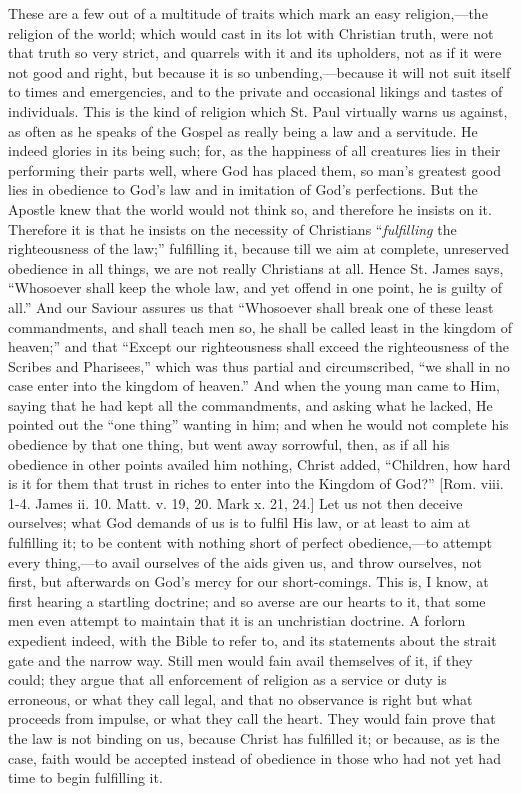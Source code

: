 These are a few out of a multitude of traits which mark an easy
religion,—the religion of the world; which would cast in its lot
with Christian truth, were not that truth so very strict, and quarrels
with it and its upholders, not as if it were not good and right, but
because it is so unbending,—because it will not suit itself to times
and emergencies, and to the private and occasional likings and tastes
of individuals. This is the kind of religion which St. Paul virtually
warns us against, as often as he speaks of the Gospel as really being
a law and a servitude. He indeed glories in its being such; for, as
the happiness of all creatures lies in their performing their parts
well, where God has placed them, so man's greatest good lies in
obedience to God's law and in imitation of God's perfections. But the
Apostle knew that the world would not think so, and therefore he
insists on it. Therefore it is that he insists on the necessity of
Christians ``\emph{fulfilling} the righteousness of the law;''
fulfilling it, because till we aim at complete, unreserved obedience
in all things, we are not really Christians at all. Hence St. James
says, ``Whosoever shall keep the whole law, and yet offend in one
point, he is guilty of all.'' And our Saviour assures us that
``Whosoever shall break one of these least commandments, and shall
teach men so, he shall be called least in the kingdom of heaven;''
and that ``Except our righteousness shall exceed the righteousness
of the Scribes and Pharisees,'' which was thus partial and
circumscribed, ``we shall in no case enter into the kingdom of
heaven.'' And when the young man came to Him, saying that he had
kept all the commandments, and asking what he lacked, He pointed out
the ``one thing'' wanting in him; and when he would not
complete his obedience by that one thing, but went away sorrowful,
then, as if all his obedience in other points availed him nothing,
Christ added, ``Children, how hard is it for them that trust in
riches to enter into the Kingdom of God?'' [Rom. viii. 1-4. James
ii. 10. Matt. v. 19, 20. Mark x. 21, 24.] Let us not then deceive
ourselves; what God demands of us is to fulfil His law, or at least to
aim at fulfilling it; to be content with nothing short of perfect
obedience,—to attempt every thing,—to avail ourselves of the aids
given us, and throw ourselves, not first, but afterwards on God's
mercy for our short-comings. This is, I know, at first hearing a
startling doctrine; and so averse are our hearts to it, that some men
even attempt to maintain that it is an unchristian doctrine. A forlorn
expedient indeed, with the Bible to refer to, and its statements about
the strait gate and the narrow way. Still men would fain avail
themselves of it, if they could; they argue that all enforcement of
religion as a service or duty is erroneous, or what they call legal,
and that no observance is right but what proceeds from impulse, or
what they call the heart. They would fain prove that the law is not
binding on us, because Christ has fulfilled it; or because, as is the
case, faith would be accepted instead of obedience in those who had
not yet had time to begin fulfilling it.

